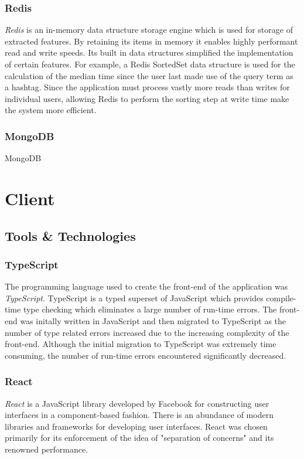 \documentclass{l4proj}
\begin{document}

        \subsubsection{Redis}
        \textit{Redis} is an in-memory data structure storage engine which is used for storage of extracted features. By retaining its items in memory it enables highly performant read and write speeds. Its built in data structures simplified the implementation of certain features. For example, a Redis SortedSet data structure is used for the calculation of the median time since the user last made use of the query term as a hashtag. Since the application must process vastly more reads than writes for individual users, allowing Redis to perform the sorting step at write time make the system more efficient.
        
         \subsubsection{MongoDB}
         MongoDB


\section{Client}

    \subsection{Tools \& Technologies}
    
        \subsubsection{TypeScript}
        The programming language used to create the front-end of the application was \textit{TypeScript}. TypeScript is a typed superset of JavaScript which provides compile-time type checking which eliminates a large number of run-time errors. The front-end was initally written in JavaScript and then migrated to TypeScript as the number of type related errors increased due to the increasing complexity of the front-end. Although the initial migration to TypeScript was extremely time consuming, the number of run-time errors encountered significantly decreased.
    
        \subsubsection{React}
        \textit{React} is a JavaScript library developed by Facebook for constructing user interfaces in a component-based fashion. There is an abundance of modern libraries and frameworks for developing user interfaces. React was chosen primarily for its enforcement of the idea of "separation of concerns" and its renowned performance.
        
\end{document}

